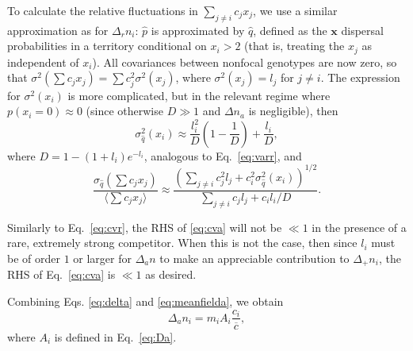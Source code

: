 \documentclass[11pt]{article}
\begin{document}
To calculate the relative fluctuations in $\sum_{j\neq i} c_j x_j$, we use a similar approximation as for $\Delta_r n_i$: $\hat{p}$ is approximated by $\hat{q}$, defined as the ${\mathbf x}$ dispersal probabilities in a territory conditional on $x_i>2$ (that is, treating the $x_j$ as independent of $x_i$). All covariances between nonfocal genotypes are now zero, so that $\sigma^2(\sum c_j x_j)=\sum c_j^2 \sigma^2(x_j)$, where $\sigma^2(x_j)=l_j$ for $j\neq i$. The expression for $\sigma^2(x_i)$ is more complicated, but in the relevant regime where $p(x_i=0)\approx 0$ (since otherwise $D\gg 1$ and $\Delta n_a$ is negligible), then
\begin{equation}
\sigma_{\hat{q}}^2(x_i)\approx\frac{l_i^2}{D}\left(1-\frac{1}{D}\right)+\frac{l_i}{D},
\end{equation}
where $D= 1-(1+l_i)e^{-l_i}$, analogous to Eq.~\eqref{eq:varr}, and 
\begin{equation}
\frac{\sigma_{\hat{q}}(\sum c_j x_j)}{\langle\sum c_j x_j\rangle} \approx\frac{\left(\sum_{j\neq i} c_j^2 l_j + c_i^2 \sigma_{\hat{q}}^2(x_i)\right)^{1/2}}{\sum_{j\neq i} c_j l_j + c_i l_i/D} \label{eq:cva}.
\end{equation}

Similarly to Eq.~\eqref{eq:cvr}, the RHS of \eqref{eq:cva} will not be $\ll 1$ in the presence of a rare, extremely strong competitor. When this is not the case, then since $l_i$ must be of order $1$ or larger for $\Delta_a n$ to make an appreciable contribution to $\Delta_+ n_i$, the RHS of Eq.~\eqref{eq:cva} is $\ll 1$ as desired. 

Combining Eqs. \eqref{eq:delta} and \eqref{eq:meanfielda}, we obtain
\begin{equation}
\Delta_a n_i=m_i A_i \frac{c_i}{\overline{c}},
\end{equation}
where $A_i$ is defined in Eq.~\eqref{eq:Da}.

%
%
\end{document}
